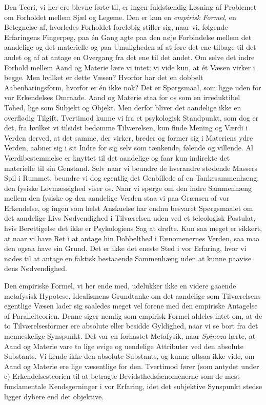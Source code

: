\documentclass[12pt,a4paper,openany]{book}
\newcommand{\opage}[1]{\marginnote{\footnotesize\textit{[#1]}}}
\begin{document}
Den Teori, vi her ere blevne førte til, er ingen fuldstændig Løsning af
Problemet om Forholdet mellem Sjæl og Legeme. Den er kun en
\emph{empirisk Formel}, en Betegnelse af, hvorledes Forholdet foreløbig
stiller sig, naar vi, følgende Erfaringens Fingerpeg, paa én Gang agte
paa den nøje Forbindelse mellem det aandelige og det materielle og paa
Umuligheden af at føre det ene tilbage til det andet og af at antage en
Overgang fra det ene til det andet. Om selve det indre Forhold mellem
Aand og Materie lære vi intet; vi vide kun, at ét Væsen virker i begge.
Men hvilket er dette Væsen? Hvorfor har det en dobbelt Aabenbaringsform,
hvorfor er én ikke nok? Det er
\opage{80}Spørgsmaal, som ligge uden for vor Erkendelses Omraade. Aand
og Materie staa for os som en irreduktibel Tohed, lige som Subjekt og
Objekt. Men derfor bliver det aandelige ikke en overflødig Tilgift.
Tvertimod kunne vi fra et psykologisk Standpunkt, som dog er det, fra
hvilket vi tilsidst bedømme Tilværelsen, kun finde Mening og Værdi i
Verden derved, at det samme, der virker, breder og former sig i
Materiens ydre Verden, aabner sig i sit Indre for sig selv som tænkende,
følende og villende. Al Værdibestemmelse er knyttet til det aandelige og
faar kun indirekte det materielle til sin Genstand. Selv naar vi beundre
de hverandre stødende Massers Spil i Rummet, beundre vi dog egentlig det
Genbillede af en Tankesammenhæng, den fysiske Lovmæssighed viser os.
Naar vi spørge om den indre Sammenhæng mellem den fysiske og den
aandelige Verden staa vi paa Grænsen af vor Erkendelse, og ingen som
helst Anskuelse har endnu besvaret Spørgsmaalet om det aandelige Livs
Nødvendighed i Tilværelsen uden ved et teleologisk Postulat, hvis
Berettigelse det ikke er Psykologiens Sag at drøfte. Kun saa meget er
sikkert, at naar vi have Ret i at antage hin Dobbelthed i Fænomenernes
Verden, saa maa den ogsaa have sin Grund. Det er ikke det eneste Sted i
vor Erfaring, hvor vi nødes til at antage en faktisk bestaaende
Sammenhæng uden at kunne paavise dens Nødvendighed.

Den empiriske Formel, vi her ende med, udelukker ikke en videre gaaende
metafysisk Hypotese. Idealismens Grundtanke om det aandelige som
Tilværelsens egentlige Væsen lader sig saaledes meget vel forene med den
empiriske Antagelse af Parallelteorien. Denne siger nemlig som empirisk
Formel aldeles intet om, at de to Tilværelsesformer ere absolute eller
besidde Gyldighed, naar vi se bort fra det menneskelige Synspunkt. Det
var en forhastet Metafysik, naar \emph{Spinoza} lærte, at Aand og
Materie vare to lige evige og uendelige Attributer ved den absolute
Substants. Vi kende ikke den absolute Substants, og kunne altsaa ikke
vide, om Aand og Materie ere lige væsentlige for den. Tvertimod fører
(som antydet under c) Erkendelsesteorien til at betragte
Bevidsthedsfænomenerne som de mest fundamentale Kendsgerninger i vor
Erfaring, idet det subjektive Synspunkt stedse ligger dybere end det
objektive.
\end{document}
